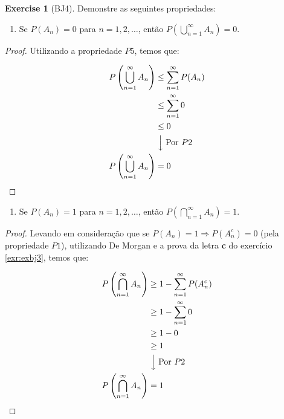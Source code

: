 \documentclass[
]{article}
\providecommand{\tightlist}{%
  \setlength{\itemsep}{0pt}\setlength{\parskip}{0pt}}
\theoremstyle{definition}
\theoremstyle{definition}
\theoremstyle{definition}
\newtheorem{exercise}{Exercise}[section]
\theoremstyle{definition}
\theoremstyle{remark}
\begin{document}
\begin{exercise}[BJ4]

Demonstre as seguintes propriedades:

\begin{enumerate}
\def\labelenumi{\alph{enumi})}
\tightlist
\item
  Se \(P(A_{n}) = 0\) para \(n = 1,2,\dots\), então \(P\left(\bigcup_{n=1}^{\infty}A_{n}\right) = 0\).
\end{enumerate}

\begin{proof}
Utilizando a propriedade \(P5\), temos que:

\begin{align*}
P\left(\bigcup_{n=1}^{\infty} A_{n}\right) &\le \sum_{n=1}^{\infty}P(A_{n}) \\
&\le \sum_{n=1}^{\infty}0 \\
&\le 0 \\
&\;\Big\downarrow \;\text{Por } P2\\
P\left(\bigcup_{n=1}^{\infty} A_{n}\right) &= 0
\end{align*}
\end{proof}

\begin{enumerate}
\def\labelenumi{\alph{enumi})}
\setcounter{enumi}{1}
\tightlist
\item
  Se \(P(A_{n}) = 1\) para \(n = 1,2,\dots\), então \(P\left(\bigcap_{n=1}^{\infty}A_{n}\right) = 1\).
\end{enumerate}

\begin{proof}
Levando em consideração que se \(P(A_{n}) = 1 \Rightarrow P(A_{n}^{c}) = 0\) (pela propriedade \(P1\)), utilizando De Morgan e a prova da letra \textbf{c} do exercício \ref{exr:exbj3}, temos que:

\begin{align*}
P\left(\bigcap_{n=1}^{\infty}A_{n}\right) &\ge 1 - \sum_{n=1}^{\infty} P(A_{n}^{c}) \\
&\ge 1 - \sum_{n=1}^{\infty}0 \\
&\ge 1 - 0 \\
&\ge 1 \\
&\;\Big\downarrow \;\text{Por } P2\\
P\left(\bigcap_{n=1}^{\infty}A_{n}\right) &= 1
\end{align*}
\end{proof}

\end{exercise}
\end{document}
